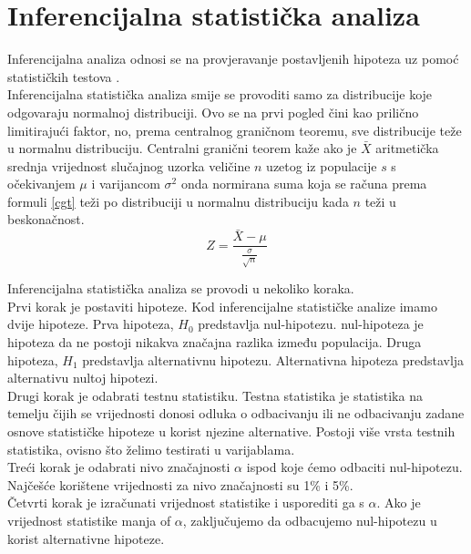 \documentclass[times,utf8,zavrsni]{fer}
\begin{document}
\clearpage
\section{Inferencijalna statistička analiza}
Inferencijalna analiza odnosi se na provjeravanje postavljenih hipoteza uz pomoć statističkih testova \citep{openintro}. \\ 

Inferencijalna statistička analiza smije se provoditi samo za distribucije koje odgovaraju normalnoj distribuciji. Ovo se na prvi pogled čini kao prilično limitirajući faktor, no, prema centralnog graničnom teoremu, sve distribucije teže u normalnu distribuciju. Centralni granični teorem kaže ako je $\bar{X}$ aritmetička srednja vrijednost slučajnog uzorka veličine $n$ uzetog iz populacije $s$ s očekivanjem $\mu$ i varijancom $\sigma^2$ onda normirana suma koja se računa prema formuli \ref{cgt} teži po distribuciji u normalnu distribuciju kada $n$ teži u beskonačnost. \\
\begin{equation}
\label{cgt}
Z=\frac{\bar{X}-\mu }{\frac{\sigma }{\sqrt{n}}}
\end{equation}


\noindent Inferencijalna statistička analiza se provodi u nekoliko koraka.\\ 

Prvi korak je postaviti hipoteze. Kod inferencijalne statističke analize imamo dvije hipoteze. Prva hipoteza, ${H_{0}}$ predstavlja nul-hipotezu. nul-hipoteza je hipoteza da ne postoji nikakva značajna razlika između populacija. Druga hipoteza, ${H_{1}}$ predstavlja alternativnu hipotezu. Alternativna hipoteza predstavlja alternativu nultoj hipotezi. \\

Drugi korak je odabrati testnu statistiku. Testna statistika je statistika na temelju čijih se vrijednosti donosi odluka o odbacivanju ili ne odbacivanju zadane osnove statističke hipoteze u korist njezine alternative. Postoji više vrsta testnih statistika, ovisno što želimo testirati u varijablama. \\

Treći korak je odabrati nivo značajnosti $\alpha$ ispod koje ćemo odbaciti nul-hipotezu. Najčešće korištene vrijednosti za nivo značajnosti su 1\% i 5\%. \\

Četvrti korak je izračunati vrijednost statistike i usporediti ga s $\alpha$. Ako je vrijednost statistike manja of $\alpha$, zaključujemo da odbacujemo nul-hipotezu u korist alternativne hipoteze. 
\end{document}
